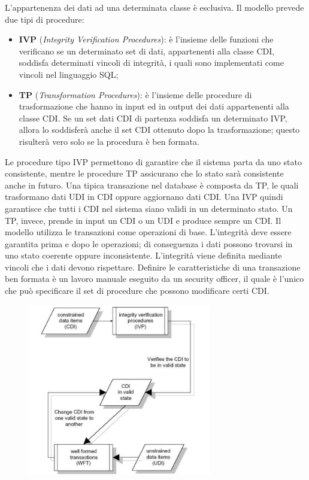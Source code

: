 L'appartenenza dei dati ad una determinata classe è esclusiva.
Il modello prevede due tipi di procedure:

\begin{itemize}
      \item \textbf{IVP} (\textit{Integrity Verification Procedures}): è
            l'insieme delle funzioni che verificano se un
            determinato set di dati, appartenenti alla classe CDI, soddisfa
            determinati vincoli di
            integrità, i quali sono implementati come vincoli nel linguaggio SQL;
      \item \textbf{TP} (\textit{Transformation Procedures}): è l'insieme delle
            procedure di trasformazione che hanno in input
            ed in output dei dati appartenenti alla classe CDI. Se un set dati
            CDI di partenza soddisfa
            un determinato IVP, allora lo soddisferà anche il set CDI ottenuto
            dopo la trasformazione;
            questo risulterà vero solo se la procedura è ben formata.
\end{itemize}

Le procedure tipo IVP permettono di garantire che il sistema parta da uno stato
consistente,
mentre le procedure TP assicurano che lo stato sarà consistente anche in futuro.
Una tipica
transazione nel database è composta da TP, le quali trasformano dati UDI in CDI
oppure
aggiornano dati CDI.
Una IVP quindi garantisce che tutti i CDI nel sistema siano validi in un
determinato stato. Un TP,
invece, prende in input un CDI o un UDI e produce sempre un CDI.
Il modello utilizza le transazioni come operazioni di base. L'integrità deve
essere garantita prima e
dopo le operazioni; di conseguenza i dati possono trovarsi in uno stato coerente
oppure
inconsistente. L'integrità viene definita mediante vincoli che i dati devono
rispettare.
Definire le caratteristiche di una transazione ben formata è un lavoro manuale
eseguito da un
security officer, il quale è l'unico che può specificare il set di procedure che
possono modificare
certi CDI.

\begin{figure}[H]
      \centering
      \includegraphics[width=8cm, keepaspectratio]{capitoli/policy/imgs/clark_wilson4.png}
\end{figure}

